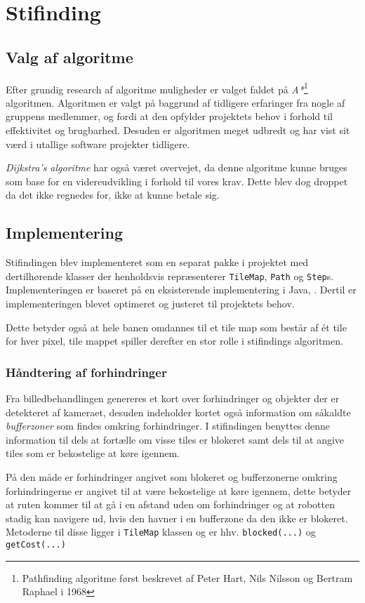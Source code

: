 \chapter{Stifinding}

\section{Valg af algoritme}
Efter grundig research af algoritme muligheder er valget faldet på \textit{A*}\footnote{Pathfinding algoritme først beskrevet af  Peter Hart, Nils Nilsson og Bertram Raphael i 1968} algoritmen.
Algoritmen er valgt på baggrund af tidligere erfaringer fra nogle af gruppens medlemmer, og fordi at den opfylder projektets behov i forhold til effektivitet og brugbarhed. Desuden er algoritmen meget udbredt og har vist sit værd i utallige software projekter tidligere.

\textit{Dijkstra's algoritme} har også været overvejet, da denne algoritme kunne bruges som base for en videreudvikling i forhold til vores krav. Dette blev dog droppet da det ikke regnedes for, ikke at kunne betale sig.

\section{Implementering}
Stifindingen blev implementeret som en separat pakke i projektet med dertilhørende klasser der henholdsvis repræsenterer \texttt{TileMap}, \texttt{Path} og \texttt{Step}s. Implementeringen er baseret på en eksisterende implementering i Java, \citet{astar}.
Dertil er implementeringen blevet optimeret og justeret til projektets behov.

Dette betyder også at hele banen omdannes til et tile map som består af ét tile for hver pixel, tile mappet spiller derefter en stor rolle i stifindings algoritmen.

\subsection{Håndtering af forhindringer}
Fra billedbehandlingen genereres et kort over forhindringer og objekter der er detekteret af kameraet, desuden indeholder kortet også information om såkaldte \textit{bufferzoner} som findes omkring forhindringer. I stifindingen benyttes denne information til dels at fortælle om visse tiles er blokeret samt dels til at angive tiles som er bekostelige at køre igennem.

På den måde er forhindringer angivet som blokeret og bufferzonerne omkring forhindringerne er angivet til at være bekostelige at køre igennem, dette betyder at ruten kommer til at gå i en afstand uden om forhindringer og at robotten stadig kan navigere ud, hvis den havner i en bufferzone da den ikke er blokeret. Metoderne til disse ligger i \texttt{TileMap} klassen og er hhv. \texttt{blocked(...)} og \texttt{getCost(...)}

